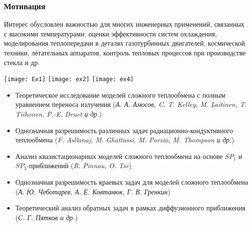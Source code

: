 \begin{frame}
    \setcounter{framenumber}{1}
    \maketitle
\end{frame}


\begin{frame}
    \frametitle{Мотивация}
    Интерес обусловлен важностью для многих
    инженерных применений, связанных с высокими температурами: оценки
    эффективности систем охлаждения, моделирования теплопередачи в деталях
    газотурбинных двигателей, космической техники, летательных аппаратов,
    контроль тепловых процессов при производстве стекла и др.

    \texttt{[image: Ex1]}
    \hfill
    \texttt{[image: ex2]}
    \hfill
    \texttt{[image: ex4]}
    \begin{itemize}
        \item Теоретическое исследование моделей сложного теплообмена с
        полным уравнением переноса излучения
        (\textit{А. А. Амосов, C. T. Kelley, M. Laitinen, T. Tiihonen, P.-E. Druet и др.})
        \item Однозначная разрешимость различных задач радиационно-кондуктивного теплообмена
        (\textit{F. Asllanaj, M. Ghattassi, M. Porzio, M. Thompson и др.})
        \item Анализ квазистационарных моделей сложного теплообмена на основе $SP_1$ и $SP_3$-приближений
        (\textit{R. Pinnau, O. Tse})
        \item Однозначная разрешимость краевых задач для моделей сложного теплообмена
        (\textit{А. Ю. Чеботарев, А. Е. Ковтанюк, Г. В. Гренкин})
        \item Теоретический анализ обратных задач в рамках диффузионного приближения
        (\textit{С. Г. Пятков и др.})
    \end{itemize}
\end{frame}

